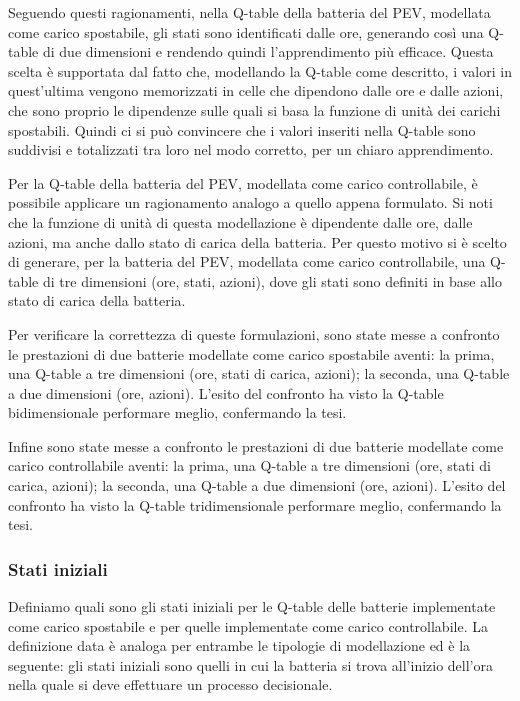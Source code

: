 \documentclass[italian, Lau, oneside]{sapthesis}
\begin{document}
Seguendo questi ragionamenti, nella Q-table della batteria del PEV, modellata come carico spostabile, gli stati sono identificati dalle ore, generando così una Q-table di due dimensioni e rendendo quindi l'apprendimento più efficace. Questa scelta è supportata dal fatto che, modellando la Q-table come descritto, i valori in quest'ultima vengono memorizzati in celle che dipendono dalle ore e dalle azioni, che sono proprio le dipendenze sulle quali si basa la funzione di unità dei carichi spostabili. Quindi ci si può convincere che i valori inseriti nella Q-table sono suddivisi e totalizzati tra loro nel modo corretto, per un chiaro apprendimento.

Per la Q-table della batteria del PEV, modellata come carico controllabile, è possibile applicare un ragionamento analogo a quello appena formulato. Si noti che la funzione di unità di questa modellazione è dipendente dalle ore, dalle azioni, ma anche dallo stato di carica della batteria. Per questo motivo si è scelto di generare, per la batteria del PEV, modellata come carico controllabile, una Q-table di tre dimensioni (ore, stati, azioni), dove gli stati sono definiti in base allo stato di carica della batteria.

Per verificare la correttezza di queste formulazioni, sono state messe a confronto le prestazioni di due batterie modellate come carico spostabile aventi: la prima, una Q-table a tre dimensioni (ore, stati di carica, azioni); la seconda, una Q-table a due dimensioni (ore, azioni). L'esito del confronto ha visto la Q-table bidimensionale performare meglio, confermando la tesi.

Infine sono state messe a confronto le prestazioni di due batterie modellate come carico controllabile aventi: la prima, una Q-table a tre dimensioni (ore, stati di carica, azioni); la seconda, una Q-table a due dimensioni (ore, azioni). L'esito del confronto ha visto la Q-table tridimensionale performare meglio, confermando la tesi.

\subsubsection{Stati iniziali}
Definiamo quali sono gli stati iniziali per le Q-table delle batterie implementate come carico spostabile e per quelle implementate come carico controllabile. La definizione data è analoga per entrambe le tipologie di modellazione ed è la seguente: gli stati iniziali sono quelli in cui la batteria si trova all'inizio dell'ora nella quale si deve effettuare un processo decisionale. 
\end{document}
